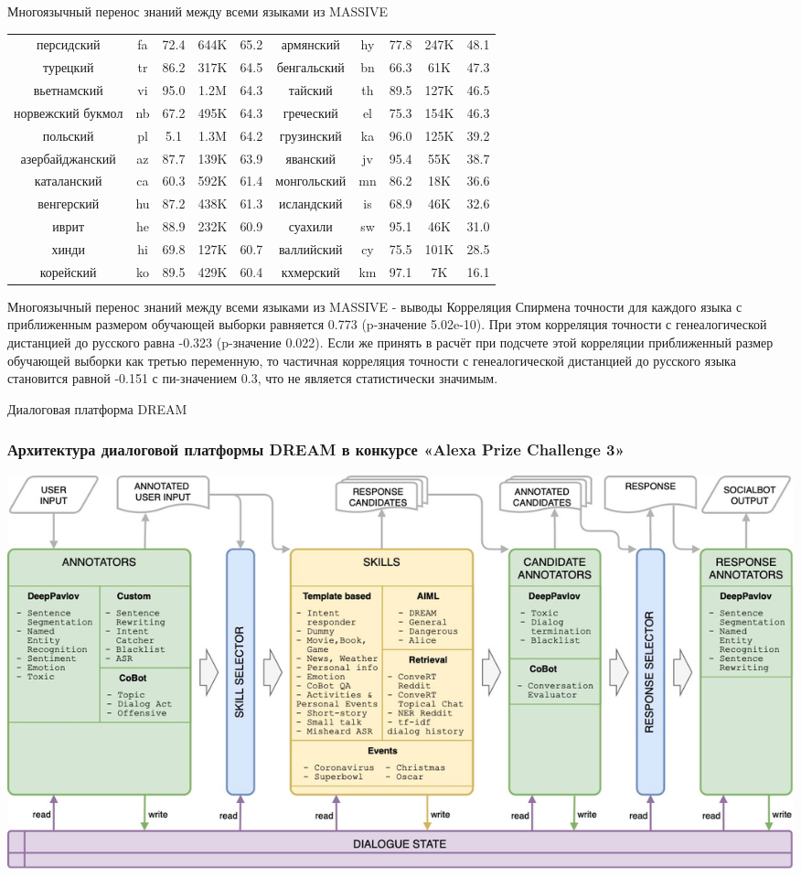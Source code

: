\begin{frame}{Многоязычный перенос знаний между всеми языками из MASSIVE}
{\begin{tabular}[baseline={(0,2.1)}]{|c|c|c|c|c||c|c|c|c|c|}
персидский & fa & 72.4 & 644K & 65.2 & армянский & hy & 77.8 & 247K & 48.1 \\
турецкий & tr & 86.2 & 317K & 64.5 & бенгальский & bn & 66.3 & 61K & 47.3 \\
вьетнамский & vi & 95.0 & 1.2M & 64.3 & тайский & th & 89.5 & 127K & 46.5 \\
норвежский букмол & nb & 67.2 & 495K & 64.3 & греческий & el & 75.3 & 154K & 46.3 \\
польский & pl & 5.1 & 1.3M & 64.2 & грузинский & ka & 96.0 & 125K & 39.2\\
азербайджанский & az & 87.7 & 139K & 63.9 & яванский & jv & 95.4 & 55K & 38.7 \\
каталанский & ca & 60.3 & 592K & 61.4 & монгольский & mn & 86.2 & 18K & 36.6 \\
венгерский & hu & 87.2 & 438K & 61.3 & исландский & is & 68.9 & 46K & 32.6 \\
иврит & he & 88.9 & 232K & 60.9 & суахили & sw & 95.1 & 46K & 31.0 \\
хинди & hi & 69.8 & 127K & 60.7 & валлийский & cy & 75.5 & 101K & 28.5 \\
корейский & ko & 89.5 & 429K & 60.4 & кхмерский & km & 97.1 & 7K & 16.1\\ \hline
\end{tabular}}
\end{frame}

\begin{frame}{Многоязычный перенос знаний между всеми языками из MASSIVE - выводы}
Корреляция Спирмена точности для каждого языка с приближенным размером обучающей выборки равняется 0.773 (p-значение 5.02e-10). При этом корреляция точности с генеалогической дистанцией до русского равна -0.323 (p-значение 0.022). Если же принять в расчёт при подсчете этой корреляции приближенный размер обучающей выборки как третью переменную, то частичная корреляция точности с генеалогической дистанцией до русского языка становится равной -0.151 с пи-значением 0.3, что не является статистически значимым.

\end{frame}

\begin{frame}{Диалоговая платформа DREAM}
    \frametitle{Архитектура диалоговой платформы {DREAM} в конкурсе «Alexa Prize Challenge 3»}
    \centering
    \includegraphics[width=0.8\linewidth]{images/Alexa1_.png} 
\end{frame}

